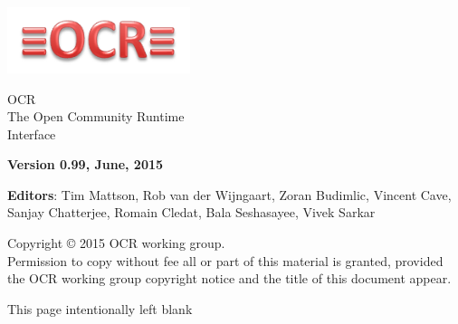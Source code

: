 
\begin{titlepage}
  \begin{flushleft}
    \hspace{-6em} \includegraphics[width=0.4\textwidth]{ocr-logo.png}
  \end{flushleft}

  \begin{adjustwidth}{-0.75in}{0in}
    \begin{center}
      \Huge
      \textsf{OCR\\The Open Community Runtime \\Interface}

      \vspace{0.5in}\textsf{ }\vspace{-0.7in}
      \normalsize
      \vspace{1.0in}
      \textbf{Version 0.99, June, 2015}
      \vspace{1.0in}

\textbf{Editors}: Tim Mattson, Rob van der Wijngaart, Zoran Budimlic,
Vincent Cave, Sanjay Chatterjee, Romain Cledat, Bala Seshasayee,
Vivek Sarkar
    \end{center}
  \end{adjustwidth}
  \vspace{2.0in}

  \begin{adjustwidth}{0pt}{1em}\setlength{\parskip}{0.25\baselineskip}%
Copyright © 2015 OCR working group.\\
Permission to copy without fee all or part of this material is granted,
provided the OCR working group copyright notice and
the title of this document appear.
  \end{adjustwidth}
\end{titlepage}


\clearpage
\thispagestyle{empty}
\phantom{a}
This page intentionally left blank
\vfill
